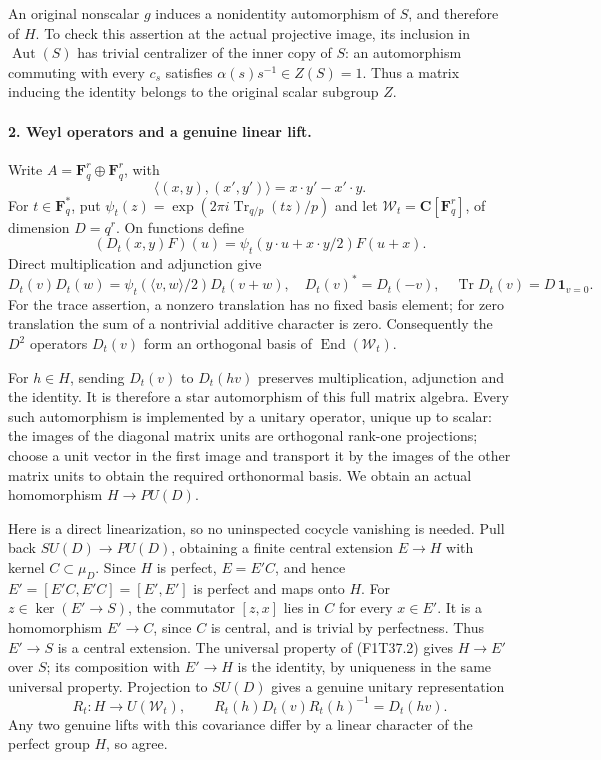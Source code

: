 An original nonscalar \(g\) induces a nonidentity automorphism
of \(S\), and therefore of \(H\). To check this assertion at
the actual projective image, its inclusion in
\(\operatorname{Aut}(S)\) has trivial centralizer of the inner
copy of \(S\): an automorphism commuting with every
\(c_s\) satisfies \(\alpha(s)s^{-1}\in Z(S)=1\).
Thus a matrix inducing the identity belongs to the original
scalar subgroup \(Z\).

\paragraph{2. Weyl operators and a genuine linear lift.}
Write \(A=\mathbf F_q^r\oplus\mathbf F_q^r\), with
\[
 \langle(x,y),(x',y')\rangle=x\cdot y'-x'\cdot y.
\]
For \(t\in\mathbf F_q^*\), put
\(\psi_t(z)=\exp(2\pi i\operatorname{Tr}_{q/p}(tz)/p)\)
and let \(\mathcal W_t=\mathbf C[\mathbf F_q^r]\), of
dimension \(D=q^r\). On functions define
\[
 (D_t(x,y)F)(u)=
       \psi_t(y\cdot u+x\cdot y/2)F(u+x).
\tag{F1T37.5}
\]
Direct multiplication and adjunction give
\[
 D_t(v)D_t(w)=\psi_t(\langle v,w\rangle/2)D_t(v+w),
 \quad D_t(v)^*=D_t(-v),
 \quad \operatorname{Tr}D_t(v)=D\,\mathbf1_{v=0}.
\tag{F1T37.6}
\]
For the trace assertion, a nonzero translation has no fixed
basis element; for zero translation the sum of a nontrivial
additive character is zero. Consequently the \(D^2\) operators
\(D_t(v)\) form an orthogonal basis of
\(\operatorname{End}(\mathcal W_t)\).

For \(h\in H\), sending \(D_t(v)\) to \(D_t(hv)\)
preserves multiplication, adjunction and the identity. It is
therefore a star automorphism of this full matrix algebra.
Every such automorphism is implemented by a unitary operator,
unique up to scalar: the images of the diagonal matrix units
are orthogonal rank-one projections; choose a unit vector in
the first image and transport it by the images of the other
matrix units to obtain the required orthonormal basis.
We obtain an actual homomorphism \(H\to PU(D)\).

Here is a direct linearization, so no uninspected cocycle
vanishing is needed. Pull back \(SU(D)\to PU(D)\), obtaining
a finite central extension \(E\to H\) with kernel
\(C\subset\mu_D\). Since \(H\) is perfect,
\(E=E'C\), and hence
\(E'=[E'C,E'C]=[E',E']\) is perfect and maps onto \(H\).
For \(z\in\ker(E'\to S)\), the commutator \([z,x]\)
lies in \(C\) for every \(x\in E'\). It is a homomorphism
\(E'\to C\), since \(C\) is central, and is trivial by
perfectness. Thus \(E'\to S\) is a central extension.
The universal property of (F1T37.2) gives \(H\to E'\)
over \(S\); its composition with \(E'\to H\) is the
identity, by uniqueness in the same universal property.
Projection to \(SU(D)\) gives a genuine unitary representation
\[
 R_t:H\longrightarrow U(\mathcal W_t),\qquad
 R_t(h)D_t(v)R_t(h)^{-1}=D_t(hv).
\tag{F1T37.7}
\]
Any two genuine lifts with this covariance differ by a
linear character of the perfect group \(H\), so agree.

